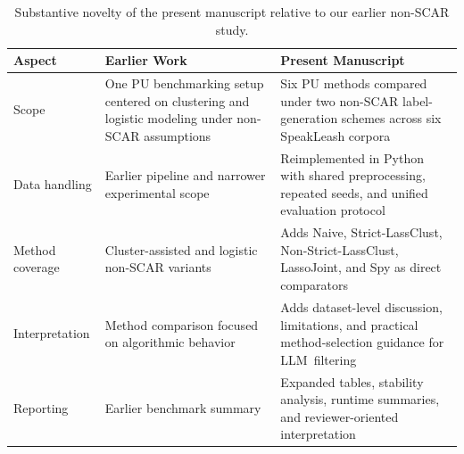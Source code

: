 \documentclass[applsci,article,accept,pdftex,moreauthors]{Definitions/mdpi}
\begin{document}
\begin{table}[H]
\centering
\caption{Substantive novelty of the present manuscript relative to our earlier non-SCAR study.}
\label{tab:novelty_comparison}
\small
\begin{tabularx}{\textwidth}{l>{\raggedright\arraybackslash}X>{\raggedright\arraybackslash}X}
\toprule
\textbf{Aspect} & \textbf{Earlier Work} & \textbf{Present Manuscript} \\
\midrule
Scope & One PU benchmarking setup centered on clustering and logistic modeling under non-SCAR assumptions & Six PU methods compared under two non-SCAR label-generation schemes across six SpeakLeash corpora \\\midrule
Data handling & Earlier pipeline and narrower experimental scope & Reimplemented in Python with shared preprocessing, repeated seeds, and unified evaluation protocol \\\midrule
Method coverage & Cluster-assisted and logistic non-SCAR variants & Adds Naive, Strict-LassClust, Non-Strict-LassClust, LassoJoint, and Spy as direct comparators \\\midrule
Interpretation & Method comparison focused on algorithmic behavior & Adds dataset-level discussion, limitations, and practical method-selection guidance for LLM~filtering \\\midrule
Reporting & Earlier benchmark summary & Expanded tables, stability analysis, runtime summaries, and reviewer-oriented interpretation \\
\bottomrule
\end{tabularx}
\end{table}
\vspace{-6pt}
\begin{table}[H]
\caption{\hl{Comparison} %
 of selected related work and the present study.}
\label{tab:novelty}
\end{table}
\end{document}
